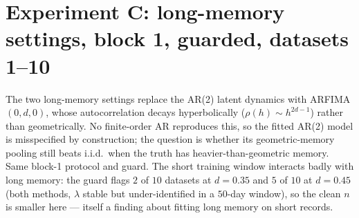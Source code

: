 \documentclass[11pt]{article}
\begin{document}
\section{Experiment C: long-memory settings, block 1, guarded, datasets 1--10}

The two long-memory settings replace the AR(2) latent dynamics with
ARFIMA$(0, d, 0)$, whose autocorrelation decays hyperbolically
($\rho(h) \sim h^{2d-1}$) rather than geometrically. No finite-order AR
reproduces this, so the fitted AR(2) model is misspecified by construction;
the question is whether its geometric-memory pooling still beats i.i.d.\ when
the truth has heavier-than-geometric memory. Same block-1 protocol and guard.
The short training window interacts badly with long memory: the guard flags
$2$ of $10$ datasets at $d = 0.35$ and $5$ of $10$ at $d = 0.45$ (both methods,
$\lambda$ stable but under-identified in a $50$-day window), so the clean $n$
is smaller here --- itself a finding about fitting long memory on short records.
\end{document}
